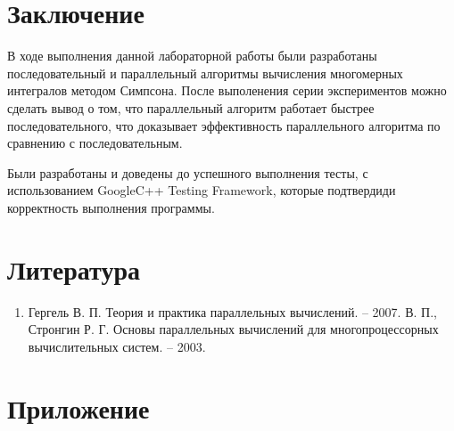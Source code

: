 \documentclass{report}
\begin{document}
\newpage

\section*{Заключение}
В ходе выполнения данной лабораторной работы были разработаны последовательный и параллельный алгоритмы вычисления многомерных интегралов методом Симпсона. После выполенения серии экспериментов можно сделать вывод о том, что параллельный алгоритм работает быстрее последовательного, что доказывает эффективность параллельного алгоритма по сравнению с последовательным.
\par Были разработаны и доведены до успешного выполнения тесты,  с использованием GoogleC++ Testing Framework, которые  подтвердиди корректность выполнения  программы.
\newpage

\section*{Литература}
\begin{enumerate}
\item Гергель В. П. Теория и практика параллельных вычислений. – 2007.
 В. П., Стронгин Р. Г. Основы параллельных вычислений для многопроцессорных вычислительных систем. – 2003.

\end{enumerate} 
\newpage

\section*{Приложение}
\end{document}
